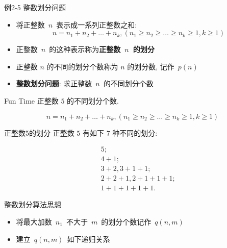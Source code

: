 \documentclass[fontset=fandol,UTF8,fleqn]{beamer}
\begin{document}
\begin{frame}{例2-5 整数划分问题}
\begin{itemize}[<+-|alert@+>]
\item 将正整数~$n$~表示成一系列正整数之和: 
\begin{displaymath}
  n=n_1+n_2+\ldots +n_k, (n_1\geq n_2 \geq \ldots \geq n_k \geq 1,  k\geq 1) 
\end{displaymath}
\item 正整数~$n$~的这种表示称为\textbf{正整数~$n$~的划分} 
\item 正整数 $n$ 的不同的划分个数称为 $n$ 的划分数, 记作~$p(n)$   
\item \textbf{整数划分问题}: 求正整数~$n$~的不同划分个数   
\end{itemize}
\end{frame}

\begin{frame}{Fun Time}
  正整数 $5$ 的不同划分个数.
  \begin{exampleblock}{}
    \begin{displaymath}
  n=n_1+n_2+\ldots +n_k, (n_1\geq n_2 \geq \ldots \geq n_k \geq 1,  k\geq 1) 
\end{displaymath}
\end{exampleblock}
\end{frame}

\begin{frame}{正整数5的划分}
  正整数 $5$ 有如下 $7$ 种不同的划分:  
  \begin{exampleblock}{}
    \begin{eqnarray*}
&   & 5;   \\
 &   & 4+1;   \\
& &   3+2,  3+1+1;   \\
 & & 2+2+1,  2+1+1+1;  \\
  & & 1+1+1+1+1.   
 \end{eqnarray*}
\end{exampleblock}
\end{frame}

\begin{frame}{整数划分算法思想}
\begin{itemize}[<+-|alert@+>]
\item 将最大加数~$n_1$~不大于~$m$~的划分个数记作~$q(n, m)$ 
\item 建立~$q(n, m)$~如下递归关系   
\end{itemize}
\end{frame}
\end{document}
